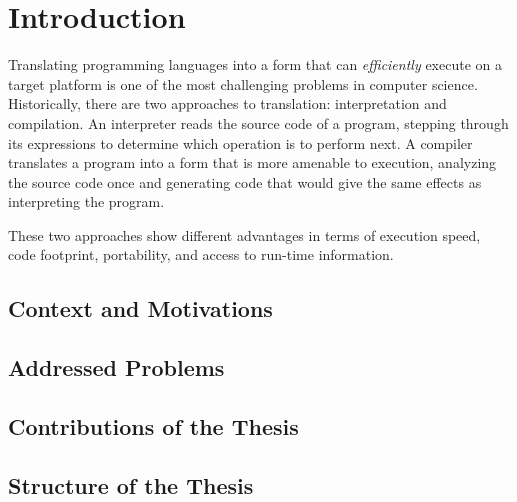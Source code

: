 \chapter{Introduction}

Translating programming languages into a form that can {\em efficiently} execute on a target platform is one of the most challenging problems in computer science. Historically, there are two approaches to translation: interpretation and compilation. An interpreter reads the source code of a program, stepping through its expressions to determine which operation is to perform next. A compiler translates a program into a form that is more amenable to execution, analyzing the source code once and generating code that would give the same effects as interpreting the program.

These two approaches show different advantages in terms of execution speed, code footprint, portability, and access to run-time information.

\section{Context and Motivations}

\section{Addressed Problems}

\section{Contributions of the Thesis}

\section{Structure of the Thesis}